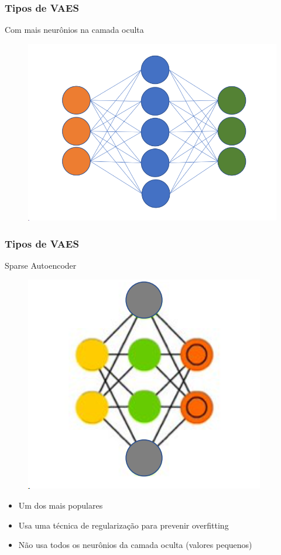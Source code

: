 \documentclass{beamer}
\begin{document}
\begin{frame}
	\frametitle{Tipos de VAES}
	\begin{block}{Com mais neurônios na camada oculta}
		\begin{figure}
			\centering
			\includegraphics[width=0.7\linewidth]{figures/vaes_archi1}
		\end{figure}
		
	\end{block}
\end{frame}
\begin{frame}
	\frametitle{Tipos de VAES}
	\begin{block}{Sparse Autoencoder}
		\begin{figure}
			\centering
			\includegraphics[width=0.4\linewidth]{figures/vaes_archi2}
		\end{figure}
	\begin{itemize}
		\item Um dos mais populares
		\item Usa uma técnica de regularização para prevenir overfitting
		\item Não usa todos os neurônios da camada oculta (valores pequenos)
	\end{itemize}
	\end{block}
\end{frame}
\end{document}
